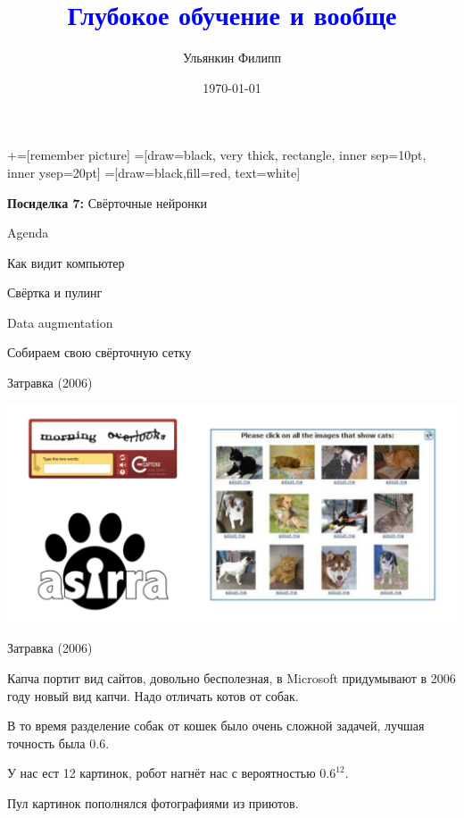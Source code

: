 \documentclass[notes,12pt, aspectratio=169]{beamer}
\title[]{\textcolor{blue}{Глубокое обучение и вообще}}
\author{Ульянкин Филипп}
\date{\today}
\newenvironment{wideitemize}{\itemize\addtolength{\itemsep}{10pt}}{\enditemize}
\begin{document}
\newcommand\marktopleft[1]{%
    \tikz[overlay,remember picture] 
        \node (marker-#1-a) at (-.3em,.3em) {};%
}
\newcommand\markbottomright[2]{%
    \tikz[overlay,remember picture] 
        \node (marker-#1-b) at (0em,0em) {};%
}
+=[remember picture] 
 =[draw=black, very thick, rectangle, inner sep=10pt, inner ysep=20pt]
 =[draw=black,fill=red, text=white]


\begin{frame}
\maketitle
\centering \textbf{\color{blue} Посиделка 7:}  Свёрточные нейронки
\end{frame}


\begin{frame}{Agenda}
\begin{wideitemize}
	\item Как видит компьютер
	\item Свёртка и пулинг
	\item Data augmentation 
	\item Собираем свою свёрточную сетку 
\end{wideitemize} 
\end{frame}


\begin{frame}{Затравка (2006)}
\begin{center}
	\includegraphics[width=.9\linewidth]{asira_capcha.png}
\end{center}
\end{frame}


\begin{frame}{Затравка (2006)}
\begin{wideitemize}
	\item Капча портит вид сайтов, довольно бесполезная, в Microsoft придумывают в 2006 году новый вид капчи. Надо отличать котов от собак. 
	\item В то время разделение собак от кошек было очень сложной задачей, лучшая точность была $0.6$. 
	\item У нас ест 12 картинок, робот нагнёт нас с вероятностью $0.6^{12}$. 
	\item Пул картинок пополнялся фотографиями из приютов. 
\end{wideitemize} 
\end{frame}
\end{document}
